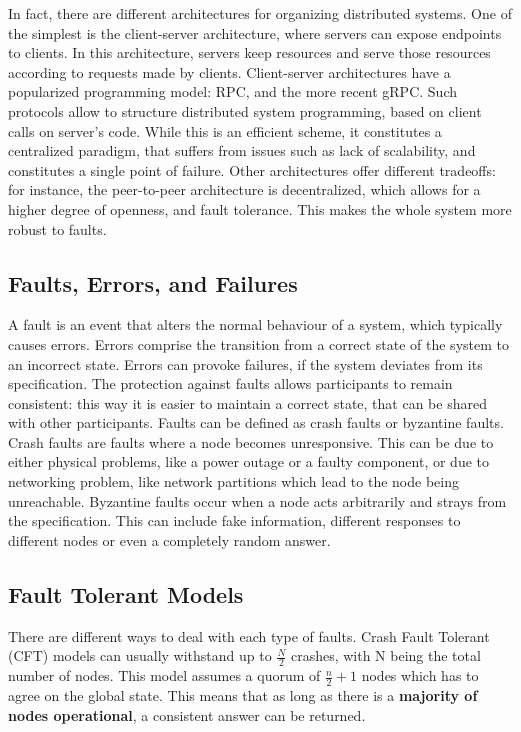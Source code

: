 \documentclass[12pt,a4paper]{article}
\begin{document}
In fact, there are different architectures for organizing distributed systems. One of the simplest is the client-server architecture, where servers can expose endpoints to clients.
In this architecture, servers keep resources and serve those resources according to requests made by clients. Client-server architectures have a popularized programming model: RPC, and the more recent gRPC. Such protocols allow to structure distributed system programming, based on client calls on server's code. While this is an efficient scheme, it constitutes a centralized paradigm, that suffers from issues such as lack of scalability, and constitutes a single point of failure. Other architectures offer different tradeoffs: for instance, the peer-to-peer architecture is decentralized, which allows for a higher degree of openness, and fault tolerance. This makes the whole system more robust to faults. 

\subsection{Faults, Errors, and Failures}
A fault is an event that alters the normal behaviour of a system, which typically causes errors. Errors comprise the transition from a correct state of the system to an incorrect state. Errors can provoke failures, if the system deviates from its specification. The protection against faults allows participants to remain consistent: this way it is easier to maintain a correct state, that can be shared with other participants. Faults can be defined as crash faults or byzantine faults. Crash faults are faults where a node becomes unresponsive. This can be due to either physical problems, like a power outage or a faulty component, or due to networking problem, like network partitions which lead to the node being unreachable. Byzantine faults occur when a node acts arbitrarily and strays from the specification. This can include fake information, different responses to different nodes or even a completely random answer.

\subsection{Fault Tolerant Models}
There are different ways to deal with each type of faults.
Crash Fault Tolerant (CFT) models can usually withstand up to $\frac{N}{2}$ crashes, with N being the total number of nodes. This model assumes a quorum of $\frac{n}{2}+1$ nodes which has to agree on the global state. This means that as long as there is a \textbf{majority of nodes operational}, a consistent answer can be returned. 
\end{document}
